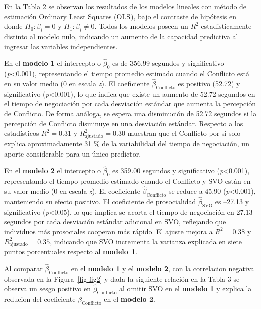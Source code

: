 \documentclass[
  spanish,
  10pt,
]{article}
\begin{document}
En la Tabla 2 se observan los resultados de los modelos lineales con
método de estimación Ordinary Least Squares (OLS), bajo el contraste de
hipótesis en donde \(H_0:\beta_i=0\) y \(H_1:\beta_i\neq0\). Todos los
modelos poseen un \(R^2\) estadisticamente distinto al modelo nulo,
indicando un aumento de la capacidad predictiva al ingresar las
variables independientes.

En el \textbf{modelo 1} el intercepto o \(\hat{\beta}_0\) es de 356.99
segundos y significativo (\emph{p}\textless0.001), representando el
tiempo promedio estimado cuando el Conflicto está en su valor medio (0
en escala \emph{z}). El coeficiente \(\hat{\beta}_{\text{Conflicto}}\)
es positivo (52.72) y significativo (\emph{p}\textless0.001), lo que
indica que existe un aumento de 52.72 segundos en el tiempo de
negociación por cada desviación estándar que aumenta la percepción de
Conflicto. De forma análoga, se espera una disminución de 52.72 segundos
si la percepción de Conflicto disminuye en una desviación estándar.
Respecto a los estadísticos \(R^2 = 0.31\) y
\(R^2_{\text{ajustado}} = 0.30\) muestran que el Conflicto por sí solo
explica aproximadamente 31 \% de la variabilidad del tiempo de
negociación, un aporte considerable para un único predictor.

En el \textbf{modelo 2} el intercepto o \(\hat{\beta}_0\) es 359.00
segundos y significativo (\emph{p}\textless0.001), representando el
tiempo promedio estimado cuando el Conflicto y SVO están en su valor
medio (0 en escala \emph{z}). El coeficiente
\(\hat{\beta}_{\text{Conflicto}}\) se reduce a 45.90
(\emph{p}\textless0.001), manteniendo su efecto positivo. El coeficiente
de prosocialidad \(\hat{\beta}_{\text{SVO}}\) es --27.13 y significativo
(\emph{p}\textless0.05), lo que implica se acorta el tiempo de
negociación en 27.13 segundos por cada desviación estándar adicional en
SVO, reflejando que individuos más prosociales cooperan más rápido. El
ajuste mejora a \(R^2 = 0.38\) y \(R^2_{\text{ajustado}} = 0.35\),
indicando que SVO incrementa la varianza explicada en siete puntos
porcentuales respecto al \textbf{modelo 1}.

Al comparar \(\hat{\beta}_{\text{Conflicto}}\) en el \textbf{modelo 1} y
el \textbf{modelo 2}, con la correlacion negativa observada en la
Figura~\ref{fig-fig2} y dada la siguiente relación en la Tabla 3 se
observa un sesgo positivo en \(\hat{\beta}_{\text{Conflicto}}\) al
omitir SVO en el \textbf{modelo 1} y explica la reducion del coeficiente
\(\hat{\beta}_{\text{Conflicto}}\) en el \textbf{modelo 2}.
\end{document}
